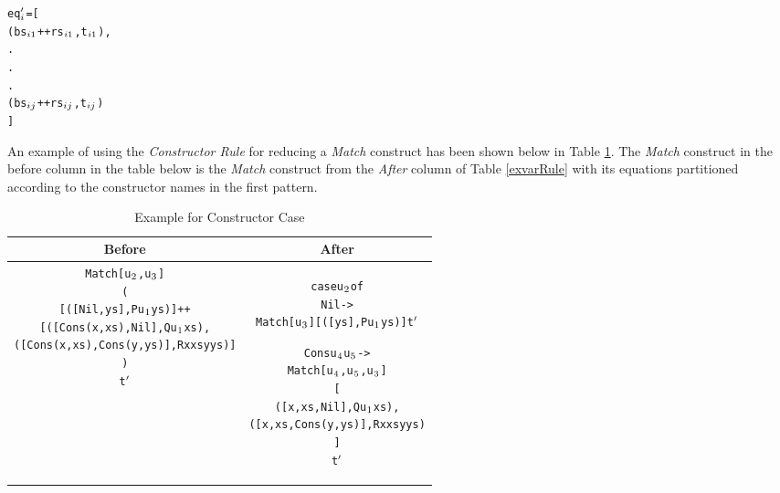 \documentclass[11pt]{article}
\begin{document}
\begin{alltt}

           eq\(\sb{i}\sp{\prime}\) = [
                    (bs\(\sb{i1}\) ++ rs\(\sb{i1}\), t\(\sb{i1}\)),
                          .
                          .
                          .
                    (bs\(\sb{ij}\) ++ rs\(\sb{ij}\), t\(\sb{ij}\))
                  ]  


\end{alltt}
An example of using the {\em Constructor Rule} for reducing a {\em Match} construct has been shown below in Table \ref {exConsRule}.
The {\em Match} construct in the before column in the table below is the {\em Match} construct from the {\em After} column of Table \ref {exvarRule} with its equations partitioned according to the constructor names in the first pattern.
~~\\ 
\begin{table}[h!]
\begin{center}
\begin{tabular}{|c|c|} \hline
{\bf Before} & {\bf After} \\ 
\hline
\begin{minipage}{3.1in}
 \begin{alltt}


Match [u\(\sb{2}\),u\(\sb{3}\)]
  (
    [([Nil,ys],P u\(\sb{1}\) ys)] ++
    [([Cons(x,xs),Nil],       Q u\(\sb{1}\) xs),
     ([Cons(x,xs),Cons(y,ys)],R x xs y ys)]
  )  
  t\(\sp{\prime}\) 


\end{alltt} 
\end {minipage} &
\begin{minipage}{3in}
 \begin{alltt}

case u\(\sb{2}\) of 
  Nil -> 
    Match [u\(\sb{3}\)] [([ys], P u\(\sb{1}\) ys)] t\(\sp{\prime}\) 

  Cons u\(\sb{4}\) u\(\sb{5}\) -> 
    Match [u\(\sb{4}\),u\(\sb{5}\),u\(\sb{3}\)]
      [
        ([x,xs,Nil],       Q u\(\sb{1}\) xs),
        ([x,xs,Cons(y,ys)],R x xs y ys)
      ]
      t\(\sp{\prime}\) 

\end{alltt} 
\end {minipage}
\tabularnewline
\hline
\end{tabular}
\caption{Example for Constructor Case}
\label{exConsRule}
\end{center}
\end{table}
\end{document}
